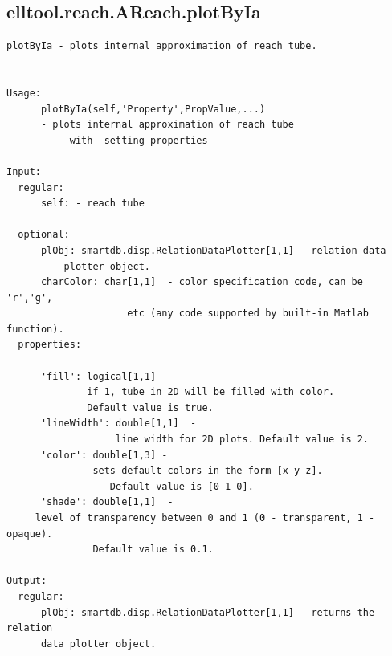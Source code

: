 \documentclass[letterpaper,10pt,english]{sphinxmanual}
\begin{document}
\subsection{elltool.reach.AReach.plotByIa}
\label{chap_functions:elltool-reach-areach-plotbyia}
\begin{Verbatim}[commandchars=\\\{\}]
plotByIa - plots internal approximation of reach tube.


Usage:
      plotByIa(self,'Property',PropValue,...)
      - plots internal approximation of reach tube
           with  setting properties

Input:
  regular:
      self: - reach tube

  optional:
      plObj: smartdb.disp.RelationDataPlotter[1,1] - relation data
          plotter object.
      charColor: char[1,1]  - color specification code, can be 'r','g',
                     etc (any code supported by built-in Matlab function).
  properties:

      'fill': logical[1,1]  -
              if 1, tube in 2D will be filled with color.
              Default value is true.
      'lineWidth': double[1,1]  -
                   line width for 2D plots. Default value is 2.
      'color': double[1,3] -
               sets default colors in the form [x y z].
                  Default value is [0 1 0].
      'shade': double[1,1]  -
     level of transparency between 0 and 1 (0 - transparent, 1 - opaque).
               Default value is 0.1.

Output:
  regular:
      plObj: smartdb.disp.RelationDataPlotter[1,1] - returns the relation
      data plotter object.
\end{Verbatim}
\end{document}
